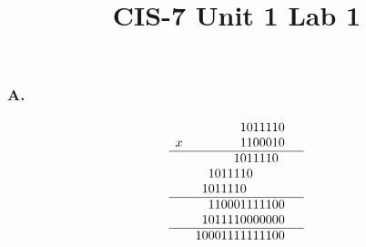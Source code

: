 \documentclass{article}
\title{CIS-7 Unit 1 Lab 1}
\begin{document}
\maketitle
\pagebreak

\subsubsection*{A.}
\[
    \begin{array}{lrr}
         &1011110& \\
        x&1100010& \\
        \hline
         &1011110 \hphantom{0}& \\
         &1011110 \hphantom{00000}&\\
         &1011110 \hphantom{000000}& \\
         \hline
         &110001111100 & \\
         &1011110000000 & \\
         \hline 
         &10001111111100 \\
    \end{array}
\]
\end{document}
